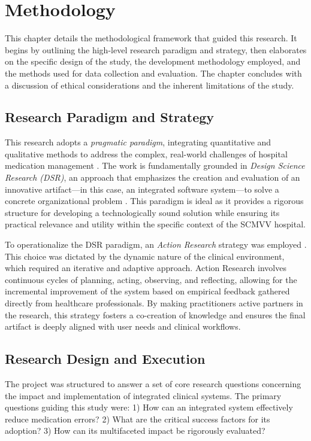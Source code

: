 \chapter{Methodology}
\label{chap:Methodology}

This chapter details the methodological framework that guided this research. It begins by outlining the high-level research paradigm and strategy, then elaborates on the specific design of the study, the development methodology employed, and the methods used for data collection and evaluation. The chapter concludes with a discussion of ethical considerations and the inherent limitations of the study.

\section{Research Paradigm and Strategy}

This research adopts a \textit{pragmatic paradigm}, integrating quantitative and qualitative methods to address the complex, real-world challenges of hospital medication management \cite{venkatesh2003}. The work is fundamentally grounded in \textit{Design Science Research (DSR)}, an approach that emphasizes the creation and evaluation of an innovative artifact—in this case, an integrated software system—to solve a concrete organizational problem \cite{martin2017}. This paradigm is ideal as it provides a rigorous structure for developing a technologically sound solution while ensuring its practical relevance and utility within the specific context of the SCMVV hospital.

To operationalize the DSR paradigm, an \textit{Action Research} strategy was employed \cite{greenhalgh2017}. This choice was dictated by the dynamic nature of the clinical environment, which required an iterative and adaptive approach. Action Research involves continuous cycles of planning, acting, observing, and reflecting, allowing for the incremental improvement of the system based on empirical feedback gathered directly from healthcare professionals. By making practitioners active partners in the research, this strategy fosters a co-creation of knowledge and ensures the final artifact is deeply aligned with user needs and clinical workflows.

\section{Research Design and Execution}

The project was structured to answer a set of core research questions concerning the impact and implementation of integrated clinical systems. The primary questions guiding this study were: 1) How can an integrated system effectively reduce medication errors? 2) What are the critical success factors for its adoption? 3) How can its multifaceted impact be rigorously evaluated?

